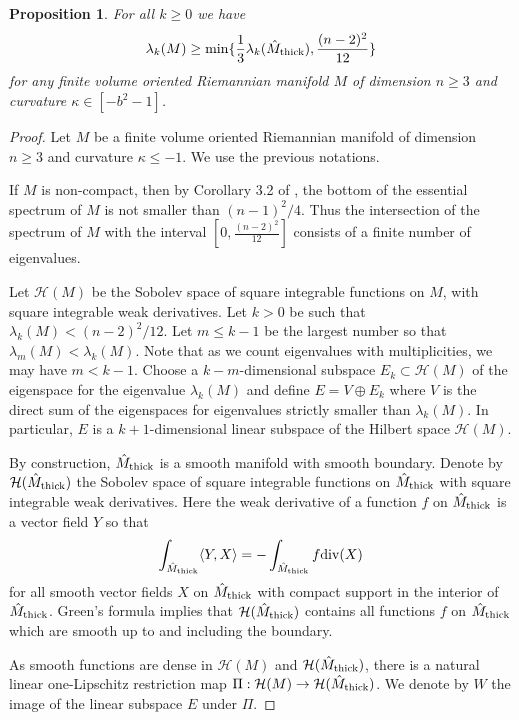 \documentclass[11pt]{amsart}
\theoremstyle{plain}
\theoremstyle{plain}
\newtheorem{proposition}[theorem]{Proposition}
\theoremstyle{definition}
\newcommand{\cal}{\mathcal}
\begin{document}
\begin{proposition}\label{lowerbound}
For all $k\geq 0$ we have 
\[\lambda_k(M)\geq \min\{
\frac{1}{3}\lambda_k(\hat M_{\rm thick}),
\frac{(n-2)^2}{12}\}\]
for any finite volume oriented Riemannian mani\-fold $M$ of dimension
$n\geq 3$ and curvature $\kappa\in [-b^2 -1]$.  
\end{proposition}
\begin{proof} Let $M$ be a finite volume oriented Riemannian manifold of dimension
$n\geq 3$ and curvature $\kappa \leq -1$.
We use the previous notations.

If $M$ is non-compact, then by Corollary 3.2 of \cite{H04}, 
the bottom of the essential 
spectrum of $M$ is not smaller than $(n-1)^2/4$. Thus the intersection of the spectrum of 
$M$ with the interval $[0,\frac{(n-2)^2}{12}]$ consists of a finite number of eigenvalues. 


Let ${\cal H}(M)$ be the Sobolev space 
of square integrable functions on $M$, with square integrable weak 
derivatives. 
Let $k>0$ be such that $\lambda_{k}(M)<(n-2)^2/12$. 
Let $m\leq k-1$ be the largest number so that $\lambda_m(M)<\lambda_k(M)$.
Note that as we count eigenvalues with multiplicities,
we may have $m<k-1$. Choose a $k-m$-dimensional subspace 
$E_k\subset {\cal H}(M)$ of the eigenspace for the eigenvalue $\lambda_k(M)$ and define 
$E=V\oplus E_k$ where $V$ is the direct sum
of the eigenspaces for eigenvalues strictly smaller than $\lambda_k(M)$.
In particular, 
$E$ is a $k+1$-dimensional linear subspace of the Hilbert space ${\cal H}(M)$. 


By construction, $\hat M_{\rm thick}$ is a smooth manifold with smooth boundary. 
Denote by ${\cal H}(\hat M_{\rm thick})$ the Sobolev space 
of square integrable functions
on $\hat M_{\rm thick}$ with square integrable weak derivatives. 
Here the weak derivative of a function $f$ on $\hat M_{\rm thick}$
is a vector field $Y$ so that
\[\int_{\hat M_{\rm thick}} \langle Y,X\rangle=
-\int_{\hat M_{\rm thick}}f{\rm div}(X)\]
for all smooth vector fields $X$ on $\hat M_{\rm thick}$ with compact
support in the interior of $\hat M_{\rm thick}$.
Green's formula implies that
${\cal H}(\hat M_{\rm thick})$ contains all functions 
$f$ on $\hat M_{\rm thick}$ which are smooth up to and including the 
boundary.


As smooth functions are dense in ${\cal H}(M)$ and 
${\cal H}(\hat M_{\rm thick})$, there 
is a natural linear one-Lipschitz restriction map
$\Pi:{\cal H}(M)\to {\cal H}(\hat M_{\rm thick})$. We denote by 
$W$ the image of the linear subspace $E$ under $\Pi$. 


\end{proof}
\end{document}
